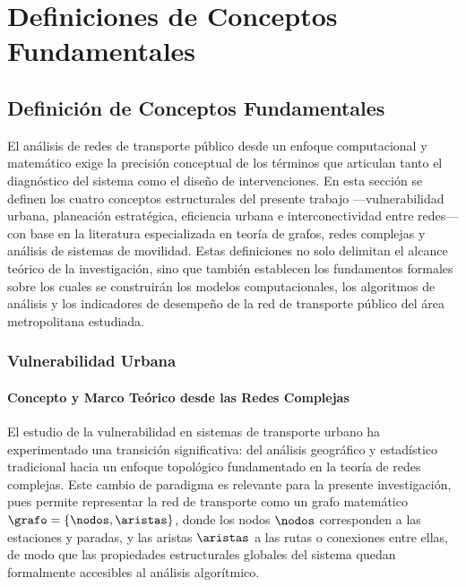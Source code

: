 
\chapter{Definiciones de Conceptos Fundamentales}
\label{ch:definiciones}

 
\section{Definición de Conceptos Fundamentales}
\label{sec:conceptos-fundamentales}
 
El análisis de redes de transporte público desde un enfoque computacional y
matemático exige la precisión conceptual de los términos que articulan tanto el
diagnóstico del sistema como el diseño de intervenciones. En esta sección se
definen los cuatro conceptos estructurales del presente trabajo
---vulnerabilidad
urbana, planeación estratégica, eficiencia urbana e interconectividad entre
redes--- con base en la literatura especializada en teoría de grafos, redes
complejas
y análisis de sistemas de movilidad. Estas definiciones no solo delimitan el
alcance
teórico de la investigación, sino que también establecen los fundamentos
formales
sobre los cuales se construirán los modelos computacionales, los algoritmos de
análisis y los indicadores de desempeño de la red de transporte público del área
metropolitana estudiada.

\subsection{Vulnerabilidad Urbana}
\label{subsec:vulnerabilidad-urbana}
 
\subsubsection{Concepto y Marco Teórico desde las Redes Complejas}
\label{subsubsec:vulnerabilidad-redes-complejas}
 
El estudio de la vulnerabilidad en sistemas de transporte urbano ha
experimentado
una transición significativa: del análisis geográfico y estadístico tradicional
hacia
un enfoque topológico fundamentado en la teoría de redes complejas. Este cambio
de paradigma es relevante para la presente investigación, pues permite
representar
la red de transporte como un grafo matemático $\grafo = \{\nodos, \aristas\}$,
donde los nodos $\nodos$ corresponden a las estaciones y paradas, y las aristas
$\aristas$ a las rutas o conexiones entre ellas, de modo que las propiedades
estructurales globales del sistema quedan formalmente accesibles al análisis
algorítmico.
 
